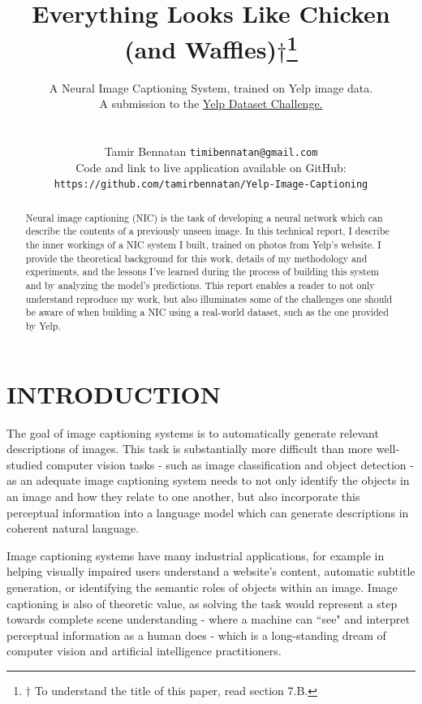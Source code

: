 \documentclass[letterpaper, 10 pt, conference]{ieeeconf}
\title{\LARGE \bf
Everything Looks Like Chicken (and Waffles)$\dagger$\thanks{$\dagger$ To understand the title of this paper, read section 7.B.}
}
\author{ \large A Neural Image Captioning System, trained on Yelp image data.\\A submission to the  \href{https://www.yelp.com/dataset/challenge}{Yelp Dataset Challenge.} \\ \\
	\parbox{2 in}{\centering Tamir Bennatan
         {\tt\small timibennatan@gmail.com}}
     \hspace*{ 0.3 in}
     \parbox{4 in}{\centering Code and link to live application available on GitHub:
         {\tt\small https://github.com/tamirbennatan/Yelp-Image-Captioning}}
        }
\begin{document}
\nocite{vinyals}
\nocite{tanti1}
\nocite{tanti2}
\nocite{cho}
\nocite{kumar}
\nocite{xu}
\nocite{8k}
\nocite{30k}
\nocite{coco}
\nocite{wu}
\nocite{vgg}
\nocite{keras}
\nocite{imagenet}
\nocite{zipf}
\nocite{word2vec}
\nocite{bleu}
\nocite{rouge}
\nocite{cider}

\maketitle
\thispagestyle{empty}
\pagestyle{empty}

\begin{abstract}
Neural image captioning (NIC) is the task of developing a neural network which can describe the contents of a previously unseen image. In this technical report, I describe the inner workings of a NIC system I built, trained on photos from Yelp's website. I provide the theoretical background for this work, details of my methodology and experiments, and the lessons I've learned during the process of building this system and by analyzing the model's predictions. This report enables a reader to not only understand reproduce my work, but also illuminates some of the challenges one should be aware of when building a NIC using a real-world dataset, such as the one provided by Yelp.
\end{abstract}




\section{INTRODUCTION}

The goal of image captioning systems is to automatically generate relevant descriptions of images. This task is substantially more difficult than more well-studied computer vision tasks - such as image classification and object detection - as an adequate image captioning system needs to not only identify the objects in an image and how they relate to one another, but also incorporate this perceptual information into a language model which can generate descriptions in coherent natural language. 

Image captioning systems have many industrial applications, for example in helping visually impaired users understand a website's content, automatic subtitle generation, or identifying the semantic roles of objects within an image. Image captioning is also of theoretic value, as solving the task would represent a step towards complete scene understanding - where a machine can ``see" and interpret perceptual information as a human does - which is a long-standing dream of computer vision and artificial intelligence practitioners. 
\end{document}
